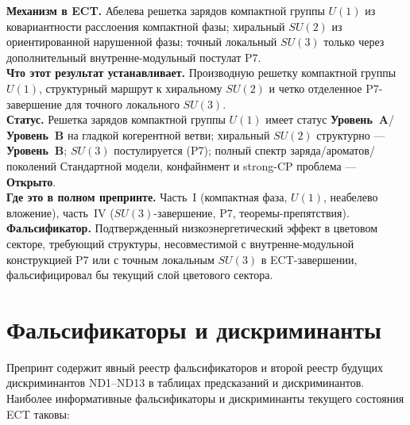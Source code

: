 \documentclass[11pt,a4paper]{article}
\newcommand{\statA}{\textbf{Уровень~A}}
\newcommand{\statB}{\textbf{Уровень~B}}
\newcommand{\statO}{\textbf{Открыто}}
\begin{document}
\begin{mechbox}
\textbf{Механизм в ECT.}
Абелева решетка зарядов компактной группы $U(1)$ из
ковариантности расслоения компактной фазы; хиральный $SU(2)$ из
ориентированной нарушенной
фазы; точный локальный $SU(3)$ только через дополнительный
внутренне-модульный постулат P7.\\
\textbf{Что этот результат устанавливает.} Производную
решетку компактной группы $U(1)$, структурный маршрут к
хиральному $SU(2)$
и четко отделенное P7-завершение для точного локального $SU(3)$.\\
\textbf{Статус.} Решетка зарядов компактной группы $U(1)$ имеет статус
\statA/\statB{} на гладкой когерентной ветви; хиральный $SU(2)$
структурно — \statB; $SU(3)$ постулируется (P7); полный спектр
заряда/ароматов/поколений Стандартной модели, конфайнмент и
strong-CP проблема — \statO.\\
\textbf{Где это в полном препринте.} Часть~I (компактная фаза,
$U(1)$, неабелево вложение), часть~IV ($SU(3)$-завершение, P7,
теоремы-препятствия).\\
\textbf{Фальсификатор.} Подтвержденный низкоэнергетический эффект
в цветовом секторе, требующий структуры, несовместимой с
внутренне-модульной конструкцией P7 или с точным локальным
$SU(3)$ в ECT-завершении, фальсифицировал бы текущий слой
цветового сектора.
\end{mechbox}

\section{Фальсификаторы и дискриминанты}
\label{sec:falsifiers}

Препринт содержит явный реестр фальсификаторов и второй реестр
будущих дискриминантов ND1--ND13 в таблицах предсказаний и
дискриминантов. Наиболее информативные фальсификаторы и
дискриминанты текущего состояния ECT таковы:
\end{document}
